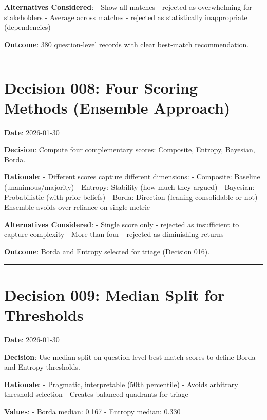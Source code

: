\documentclass[
  letterpaper,
]{report}
\begin{document}
\textbf{Alternatives Considered}: - Show all matches - rejected as
overwhelming for stakeholders - Average across matches - rejected as
statistically inappropriate (dependencies)

\textbf{Outcome}: 380 question-level records with clear best-match
recommendation.

\begin{center}\rule{0.5\linewidth}{0.5pt}\end{center}

\section{Decision 008: Four Scoring Methods (Ensemble
Approach)}\label{decision-008-four-scoring-methods-ensemble-approach}

\textbf{Date}: 2026-01-30

\textbf{Decision}: Compute four complementary scores: Composite,
Entropy, Bayesian, Borda.

\textbf{Rationale}: - Different scores capture different dimensions: -
Composite: Baseline (unanimous/majority) - Entropy: Stability (how much
they argued) - Bayesian: Probabilistic (with prior beliefs) - Borda:
Direction (leaning consolidable or not) - Ensemble avoids over-reliance
on single metric

\textbf{Alternatives Considered}: - Single score only - rejected as
insufficient to capture complexity - More than four - rejected as
diminishing returns

\textbf{Outcome}: Borda and Entropy selected for triage (Decision 016).

\begin{center}\rule{0.5\linewidth}{0.5pt}\end{center}

\section{Decision 009: Median Split for
Thresholds}\label{decision-009-median-split-for-thresholds}

\textbf{Date}: 2026-01-30

\textbf{Decision}: Use median split on question-level best-match scores
to define Borda and Entropy thresholds.

\textbf{Rationale}: - Pragmatic, interpretable (50th percentile) -
Avoids arbitrary threshold selection - Creates balanced quadrants for
triage

\textbf{Values}: - Borda median: 0.167 - Entropy median: 0.330
\end{document}
